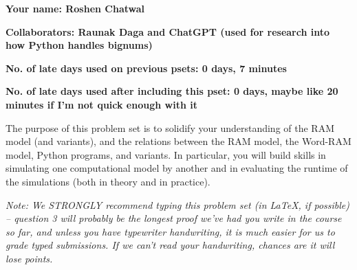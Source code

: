 \documentclass[11pt]{article}
\begin{document}

\textbf{Your name: Roshen Chatwal}

\textbf{Collaborators: Raunak Daga and ChatGPT (used for research into how Python handles bignums) }

\textbf{No. of late days used on previous psets: 0 days, 7 minutes }

\textbf{No. of late days used after including this pset: 0 days, maybe like 20 minutes if I'm not quick enough with it}


The purpose of this problem set is to solidify your understanding of the RAM model (and variants), and the relations between the RAM model, the Word-RAM model, Python programs, and variants. In particular, you will build skills in simulating one computational model by another and in evaluating the runtime of the simulations (both in theory and in practice).

\textit{Note: We STRONGLY recommend typing this problem set (in LaTeX, if possible) -- question 3 will probably be the longest proof we've had you write in the course so far, and unless you have typewriter handwriting, it is much easier for us to grade typed submissions. If we can't read your handwriting, chances are it will lose points.}
\end{document}
